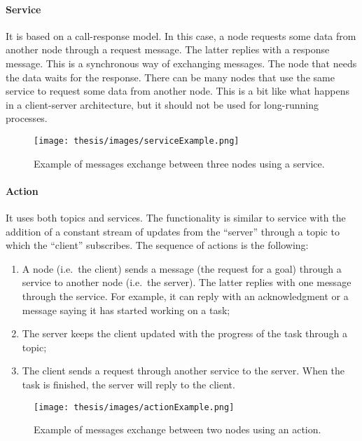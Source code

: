 \documentclass[../thesis.tex]{subfiles}
\begin{document}
\paragraph{Service}
It is based on a call-response model. In this case, a node requests some data from another node through a request message. The latter replies with a response message. This is a synchronous way of exchanging messages. The node that needs the data waits for the response. There can be many nodes that use the same service to request some data from another node. This is a bit like what happens in a client-server architecture, but it should not be used for long-running processes. 
\begin{figure}[H]
    \centering
    \texttt{[image: thesis/images/serviceExample.png]}
    \caption{Example of messages exchange between three nodes using a service.}
    \label{fig:exampleServiceExchangeMessage}
\end{figure}

\paragraph{Action}
It uses both topics and services. The functionality is similar to service with the addition of a constant stream of updates from the ``server'' through a topic to which the ``client'' subscribes. The sequence of actions is the following: 
    \begin{enumerate}
        \item A node (i.e.\ the client) sends a message (the request for a goal) through a service to another node  (i.e.\ the server). The latter replies with one message through the service. For example, it can reply with an acknowledgment or a message saying it has started working on a task; 
        \item The server keeps the client updated with the progress of the task through a topic; 
        \item The client sends a request through another service to the server. When the task is finished, the server will reply to the client. 
    \end{enumerate}
\begin{figure}[H]
    \centering
    \texttt{[image: thesis/images/actionExample.png]}
    \caption{Example of messages exchange between two nodes using an action.}
    \label{fig:exampleActionExchangeMessage}
\end{figure}
\end{document}
